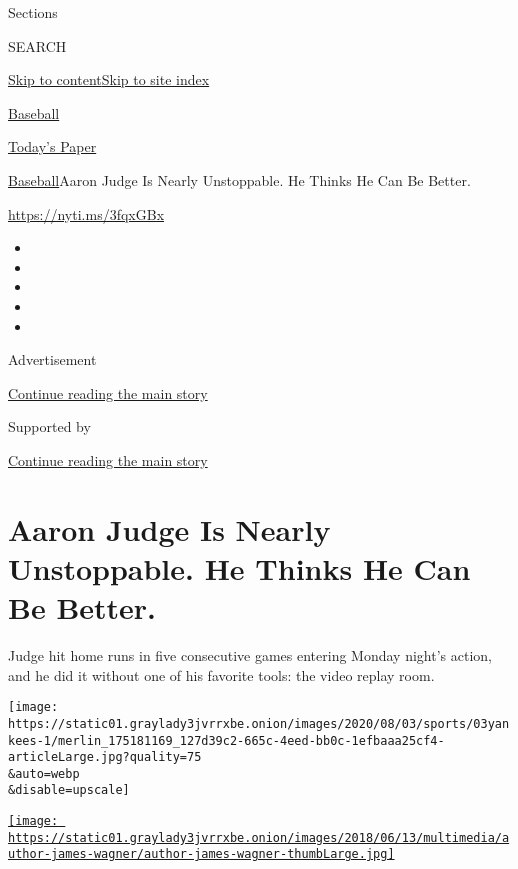 Sections

SEARCH

\protect\hyperlink{site-content}{Skip to
content}\protect\hyperlink{site-index}{Skip to site index}

\href{https://www.nytimes3xbfgragh.onion/section/sports/baseball}{Baseball}

\href{https://myaccount.nytimes3xbfgragh.onion/auth/login?response_type=cookie\&client_id=vi}{}

\href{https://www.nytimes3xbfgragh.onion/section/todayspaper}{Today's
Paper}

\href{/section/sports/baseball}{Baseball}\textbar{}Aaron Judge Is Nearly
Unstoppable. He Thinks He Can Be Better.

\url{https://nyti.ms/3fqxGBx}

\begin{itemize}
\item
\item
\item
\item
\item
\end{itemize}

Advertisement

\protect\hyperlink{after-top}{Continue reading the main story}

Supported by

\protect\hyperlink{after-sponsor}{Continue reading the main story}

\hypertarget{aaron-judge-is-nearly-unstoppable-he-thinks-he-can-be-better}{%
\section{Aaron Judge Is Nearly Unstoppable. He Thinks He Can Be
Better.}\label{aaron-judge-is-nearly-unstoppable-he-thinks-he-can-be-better}}

Judge hit home runs in five consecutive games entering Monday night's
action, and he did it without one of his favorite tools: the video
replay room.

\texttt{[image: https://static01.graylady3jvrrxbe.onion/images/2020/08/03/sports/03yankees-1/merlin\_175181169\_127d39c2-665c-4eed-bb0c-1efbaaa25cf4-articleLarge.jpg?quality=75\\\&auto=webp\\\&disable=upscale]}

\href{https://www.nytimes3xbfgragh.onion/by/james-wagner}{\texttt{[image: https://static01.graylady3jvrrxbe.onion/images/2018/06/13/multimedia/author-james-wagner/author-james-wagner-thumbLarge.jpg]}}

